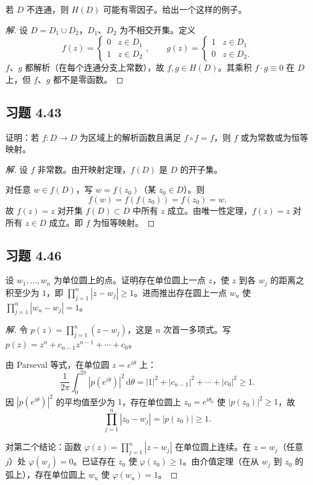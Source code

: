 \documentclass[11pt,a4paper]{article}
\newcommand{\dd}{\mathrm{d}}
\theoremstyle{definition}
\newenvironment{solution}{\begin{proof}[解]}{\end{proof}}
\begin{document}
若 $D$ 不连通，则 $H(D)$ 可能有零因子。给出一个这样的例子。

\begin{solution}
  设 $D = D_1 \cup D_2$，$D_1$、$D_2$ 为不相交开集。定义
  \[
    f(z) = \begin{cases} 0 & z \in D_1 \\ 1 & z \in D_2 \end{cases},
    \qquad
    g(z) = \begin{cases} 1 & z \in D_1 \\ 0 & z \in D_2. \end{cases}
  \]
  $f$、$g$ 都解析（在每个连通分支上常数），故 $f, g \in H(D)$。其乘积 $f \cdot g \equiv 0$ 在 $D$ 上，但 $f$、$g$ 都不是零函数。
\end{solution}

\subsection{习题 4.43}

证明：若 $f : D \to D$ 为区域上的解析函数且满足 $f \circ f = f$，则 $f$ 或为常数或为恒等映射。

\begin{solution}
  设 $f$ 非常数。由开映射定理，$f(D)$ 是 $D$ 的开子集。

  对任意 $w \in f(D)$，写 $w = f(z_0)$（某 $z_0 \in D$）。则
  \[
    f(w) = f(f(z_0)) = f(z_0) = w.
  \]
  故 $f(z) = z$ 对开集 $f(D) \subset D$ 中所有 $z$ 成立。由唯一性定理，$f(z) = z$ 对所有 $z \in D$ 成立。即 $f$ 为恒等映射。
\end{solution}

\subsection{习题 4.46}

设 $w_1, \ldots, w_n$ 为单位圆上的点。证明存在单位圆上一点 $z$，使 $z$ 到各 $w_j$ 的距离之积至少为 $1$，即 $\prod_{j=1}^{n} |z - w_j| \ge 1$。进而推出存在圆上一点 $w_u$ 使 $\prod_{j=1}^{n} |w_u - w_j| = 1$。

\begin{solution}
  令 $p(z) = \prod_{j=1}^{n}(z - w_j)$，这是 $n$ 次首一多项式。写 $p(z) = z^n + c_{n-1}z^{n-1} + \cdots + c_0$。

  由 Parseval 等式，在单位圆 $z = e^{i\theta}$ 上：
  \[
    \frac{1}{2\pi}\int_0^{2\pi} |p(e^{i\theta})|^2 \,\dd\theta
    = |1|^2 + |c_{n-1}|^2 + \cdots + |c_0|^2
    \ge 1.
  \]
  因 $|p(e^{i\theta})|^2$ 的平均值至少为 $1$，存在单位圆上 $z_0 = e^{i\theta_0}$ 使 $|p(z_0)|^2 \ge 1$，故
  \[
    \prod_{j=1}^{n} |z_0 - w_j| = |p(z_0)| \ge 1.
  \]

  对第二个结论：函数 $\varphi(z) = \prod_{j=1}^n |z - w_j|$ 在单位圆上连续。在 $z = w_j$（任意 $j$）处 $\varphi(w_j) = 0$。已证存在 $z_0$ 使 $\varphi(z_0) \ge 1$。由介值定理（在从 $w_j$ 到 $z_0$ 的弧上），存在单位圆上 $w_u$ 使 $\varphi(w_u) = 1$。
\end{solution}
\end{document}
